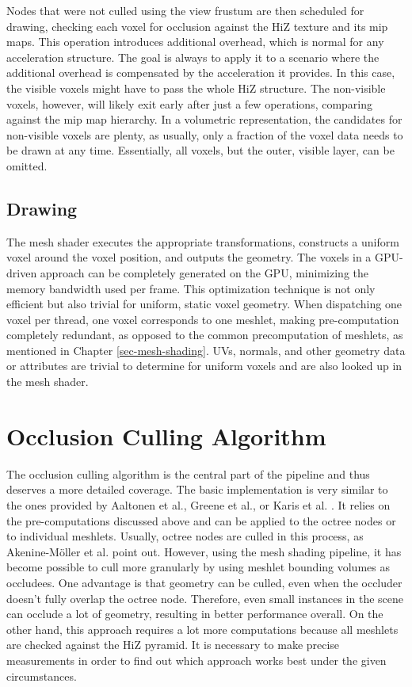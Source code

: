 \noindent
Nodes that were not culled using the view frustum are then scheduled for drawing, checking each voxel for occlusion against the 
\ac{HiZ} texture and its mip maps. This operation introduces additional overhead, which is normal for any acceleration structure. 
The goal is always to apply it to a scenario where the additional overhead is compensated by the acceleration it provides. 
In this case, the visible voxels might have to pass the whole \ac{HiZ} structure. The non-visible voxels, however, will likely 
exit early after just a few operations, comparing against the mip map hierarchy. In a volumetric representation, the candidates 
for non-visible voxels are plenty, as usually, only a fraction of the voxel data needs to be drawn at any time. Essentially, 
all voxels, but the outer, visible layer, can be omitted.

\subsection*{Drawing} \label{subsec-mesh-shader}

The mesh shader executes the appropriate transformations, constructs a uniform voxel around the voxel position, 
and outputs the geometry. The voxels in a \ac{GPU}-driven approach can be completely generated on the \ac{GPU}, 
minimizing the memory bandwidth used per frame. This optimization technique is not only efficient but also 
trivial for uniform, static voxel geometry. When dispatching one voxel per thread, one voxel corresponds 
to one meshlet, making pre-computation completely redundant, as opposed to the common precomputation of meshlets, 
as mentioned in Chapter \ref{sec-mesh-shading}. UVs, normals, and other geometry data or attributes are 
trivial to determine for uniform voxels and are also looked up in the mesh shader.


\section{Occlusion Culling Algorithm} \label{sec-occlusion}

The occlusion culling algorithm is the central part of the pipeline and thus deserves a more detailed coverage. The 
basic implementation is very similar to the ones provided by Aaltonen et al., Greene et al., or Karis et al. 
\cite{Aaltonen2015,Greene93,Karis2021}. It relies on the pre-computations discussed above and can be applied to the 
octree nodes or to individual meshlets. Usually, octree nodes are culled in this process, as Akenine-Möller et al. 
\cite{AkenineMoeller2018} point out. However, using the mesh shading pipeline, it has become possible to cull more 
granularly by using meshlet bounding volumes as occludees. One advantage is that geometry can be culled, even when 
the occluder doesn't fully overlap the octree node. Therefore, even small instances in the scene can occlude a lot 
of geometry, resulting in better performance overall. On the other hand, this approach requires a lot more 
computations because all meshlets are checked against the \ac{HiZ} pyramid. It is necessary to make precise 
measurements in order to find out which approach works best under the given circumstances.


